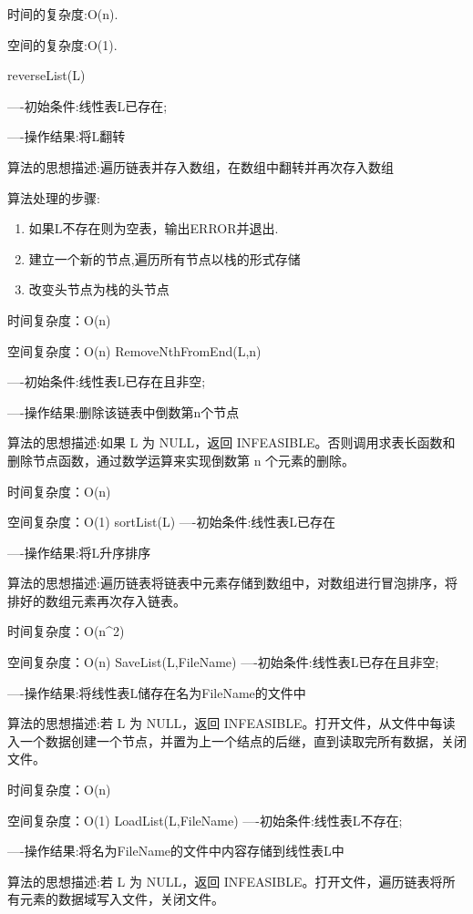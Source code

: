 \documentclass[supercite]{Experimental_Report}
\theoremstyle{definition}
\begin{document}
时间的复杂度:O(n).

空间的复杂度:O(1).

reverseList(L)

----初始条件:线性表L已存在;

----操作结果:将L翻转

算法的思想描述:遍历链表并存入数组，在数组中翻转并再次存入数组

算法处理的步骤:
\begin{enumerate}
	\renewcommand{\labelenumi}{\theenumi)}
	\item 如果L不存在则为空表，输出ERROR并退出.
	\item 建立一个新的节点,遍历所有节点以栈的形式存储
	\item 改变头节点为栈的头节点
\end{enumerate}

时间复杂度：O(n)

空间复杂度：O(n)
RemoveNthFromEnd(L,n)

----初始条件:线性表L已存在且非空;

----操作结果:删除该链表中倒数第n个节点

算法的思想描述:如果 L 为 NULL，返回 INFEASIBLE。否则调用求表长函数和删除节点函数，通过数学运算来实现倒数第 n 个元素的删除。	

时间复杂度：O(n)

空间复杂度：O(1)
sortList(L)
----初始条件:线性表L已存在

----操作结果:将L升序排序

算法的思想描述:遍历链表将链表中元素存储到数组中，对数组进行冒泡排序，将排好的数组元素再次存入链表。

时间复杂度：O(n^2)

空间复杂度：O(n)
SaveList(L,FileName)
----初始条件:线性表L已存在且非空;

----操作结果:将线性表L储存在名为FileName的文件中

算法的思想描述:若 L 为 NULL，返回 INFEASIBLE。打开文件，从文件中每读入一个数据创建一个节点，并置为上一个结点的后继，直到读取完所有数据，关闭文件。

时间复杂度：O(n)

空间复杂度：O(1)
LoadList(L,FileName)
----初始条件:线性表L不存在;

----操作结果:将名为FileName的文件中内容存储到线性表L中

算法的思想描述:若 L 为 NULL，返回 INFEASIBLE。打开文件，遍历链表将所有元素的数据域写入文件，关闭文件。
\end{document}
